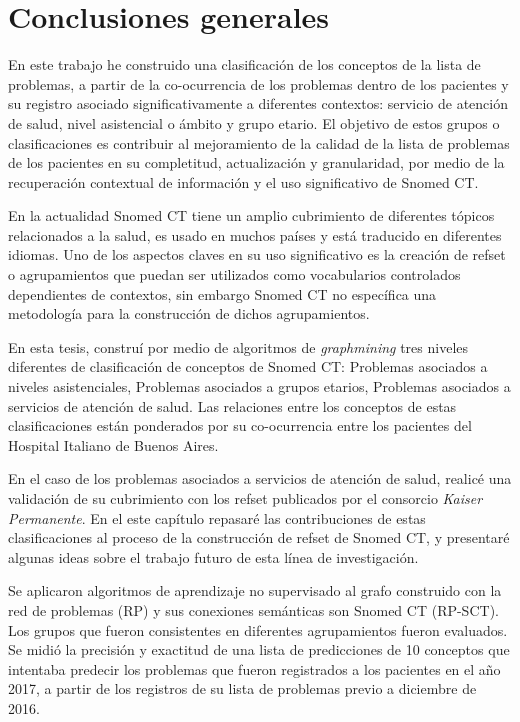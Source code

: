 \section{Conclusiones generales}
En este trabajo he construido una clasificación de los conceptos de la lista de problemas, a partir de la co-ocurrencia de los problemas dentro de los pacientes y su registro asociado significativamente a diferentes contextos: servicio de atención de salud, nivel asistencial o ámbito y grupo etario. El objetivo de estos grupos o clasificaciones es contribuir al mejoramiento de la calidad de la lista de problemas de los pacientes en su completitud, actualización y granularidad, por medio de la recuperación contextual de información y el uso significativo de Snomed CT.

En la actualidad Snomed CT tiene un amplio cubrimiento de diferentes tópicos relacionados a la salud, es usado en muchos países y está traducido en diferentes idiomas. Uno de los aspectos claves en su uso significativo es la creación de \acrshort{refset} o agrupamientos que puedan ser utilizados como vocabularios controlados dependientes de contextos, sin embargo Snomed CT no específica una metodología para la construcción de dichos agrupamientos.

En esta tesis, construí por medio de algoritmos de \textit{graphmining} tres niveles diferentes de clasificación de conceptos de Snomed CT: Problemas asociados a niveles asistenciales, Problemas asociados a grupos etarios, Problemas asociados a servicios de atención de salud. Las relaciones entre los conceptos de estas clasificaciones están ponderados por su co-ocurrencia entre los pacientes del Hospital Italiano de Buenos Aires.

En el caso de los problemas asociados a servicios de atención de salud, realicé una validación de su cubrimiento con los \acrshort{refset} publicados por el consorcio \textit{Kaiser Permanente}. En el este capítulo repasaré las contribuciones de estas clasificaciones al proceso de la construcción de \acrshort{refset} de Snomed CT, y presentaré algunas ideas sobre el trabajo futuro de esta línea de investigación.

Se aplicaron algoritmos de aprendizaje no supervisado al grafo construido con la red de problemas (\acrshort{RP})  y sus conexiones semánticas son Snomed CT (\acrshort{RP-SCT}). Los grupos que fueron consistentes en diferentes agrupamientos fueron evaluados. Se midió  la precisión y exactitud de una lista de predicciones de 10 conceptos que intentaba predecir los problemas que fueron registrados a los pacientes en el año 2017, a partir de los registros de su lista de problemas previo a diciembre de 2016. 


